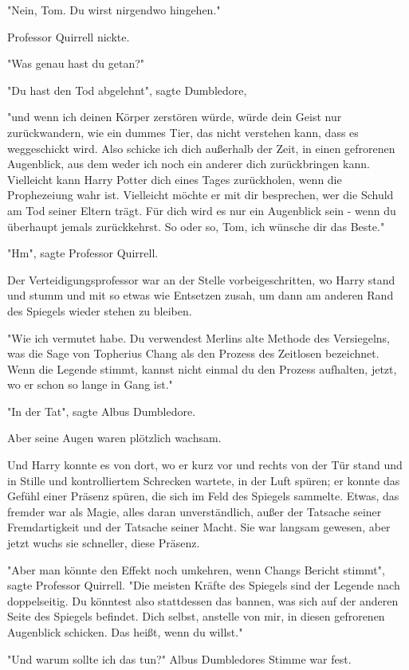 {"Nein, Tom. Du wirst nirgendwo hingehen."

Professor Quirrell nickte.

"Was genau hast du getan?"

"Du hast den Tod abgelehnt", sagte Dumbledore,

"und wenn ich deinen Körper zerstören würde, würde dein Geist nur zurückwandern, wie ein dummes Tier, das nicht verstehen kann, dass es weggeschickt wird. Also schicke ich dich außerhalb der Zeit, in einen gefrorenen Augenblick, aus dem weder ich noch ein anderer dich zurückbringen kann. Vielleicht kann Harry Potter dich eines Tages zurückholen, wenn die Prophezeiung wahr ist. Vielleicht möchte er mit dir besprechen, wer die Schuld am Tod seiner Eltern trägt. Für dich wird es nur ein Augenblick sein - wenn du überhaupt jemals zurückkehrst. So oder so, Tom, ich wünsche dir das Beste."

"Hm", sagte Professor Quirrell.

Der Verteidigungsprofessor war an der Stelle vorbeigeschritten, wo Harry stand und stumm und mit so etwas wie Entsetzen zusah, um dann am anderen Rand des Spiegels wieder stehen zu bleiben.

"Wie ich vermutet habe. Du verwendest Merlins alte Methode des Versiegelns, was die Sage von Topherius Chang als den Prozess des Zeitlosen bezeichnet. Wenn die Legende stimmt, kannst nicht einmal du den Prozess aufhalten, jetzt, wo er schon so lange in Gang ist."

"In der Tat", sagte Albus Dumbledore.

Aber seine Augen waren plötzlich wachsam.

Und Harry konnte es von dort, wo er kurz vor und rechts von der Tür stand und in Stille und kontrolliertem Schrecken wartete, in der Luft spüren; er konnte das Gefühl einer Präsenz spüren, die sich im Feld des Spiegels sammelte. Etwas, das fremder war als Magie, alles daran unverständlich, außer der Tatsache seiner Fremdartigkeit und der Tatsache seiner Macht. Sie war langsam gewesen, aber jetzt wuchs sie schneller, diese Präsenz.

"Aber man könnte den Effekt noch umkehren, wenn Changs Bericht stimmt", sagte Professor Quirrell. "Die meisten Kräfte des Spiegels sind der Legende nach doppelseitig. Du könntest also stattdessen das bannen, was sich auf der anderen Seite des Spiegels befindet. Dich selbst, anstelle von mir, in diesen gefrorenen Augenblick schicken. Das heißt, wenn du willst."

"Und warum sollte ich das tun?" Albus Dumbledores Stimme war fest.

}
